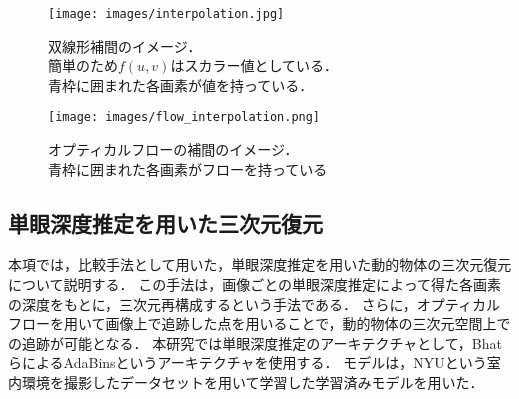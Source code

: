\begin{figure}[h]
	\centering
	\texttt{[image: images/interpolation.jpg]}
	\caption[双線形補間のイメージ]{双線形補間のイメージ．\\簡単のため$f(u,v)$はスカラー値としている．\\青枠に囲まれた各画素が値を持っている．}
	\label{fig:interpolation}
\end{figure}
\begin{figure}[h]
	\centering
	\texttt{[image: images/flow\_interpolation.png]}
	\caption[オプティカルフローの補間のイメージ]{オプティカルフローの補間のイメージ．\\青枠に囲まれた各画素がフローを持っている}
	\label{fig:flow_interpolation}
\end{figure}


\begin{comment}
\begin{figure}[h]
\centering
 \begin{minipage}[t]{0.6\hsize}
   \centering
   
   \texttt{[image: images/interpolation.jpg]}
   \subcaption{双線形補間のイメージ．簡単のため$f(u,v)$はスカラー値としている．}
   \label{fig:interpolation_left}
  
 \end{minipage}
 \begin{minipage}[t]{0.35\hsize}
   \centering
   
   \texttt{[image: images/flow\_interpolation.png]}
   \subcaption{オプティカルフローの補間のイメージ}
   \label{fig:interpolation_right}
 \end{minipage}
 \caption{オプティカルフローの双線形補間のイメージ}
 \label{fig:flow_interpolation}
\end{figure}
\end{comment}

\subsection{単眼深度推定を用いた三次元復元}\label{subsubsec:prepare_depth_estimation}
本項では，比較手法として用いた，単眼深度推定を用いた動的物体の三次元復元について説明する．
この手法は，画像ごとの単眼深度推定によって得た各画素の深度をもとに，三次元再構成するという手法である．
さらに，オプティカルフローを用いて画像上で追跡した点を用いることで，動的物体の三次元空間上での追跡が可能となる．
本研究では単眼深度推定のアーキテクチャとして，Bhatら\cite{Bhat_2021_CVPR}によるAdaBinsというアーキテクチャを使用する．
モデルは，NYU\cite{silberman2012indoor}という室内環境を撮影したデータセットを用いて学習した学習済みモデルを用いた．
